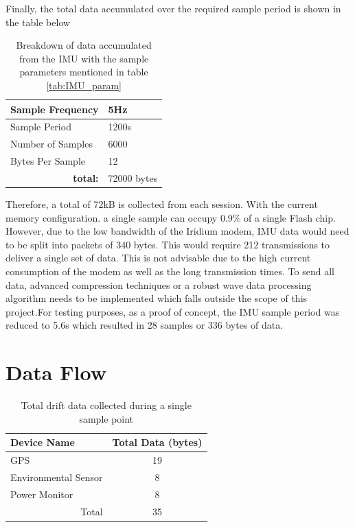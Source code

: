 Finally, the total data accumulated over the required sample period is shown in the table below

\begin{table}[H]
	\centering
	\caption{Breakdown of data accumulated from the IMU with the sample parameters mentioned in table \ref{tab:IMU_param}}
	\begin{tabular}{|l|l|}
		\hline
		Sample Frequency     &  5Hz\\
		\hline
		Sample Period        & 1200s\\
		\hline
		Number of Samples    & 6000 \\ 
		\hline
		Bytes Per Sample     & 12 \\
		\hline
		\multicolumn{1}{r}{\textbf{total:}} & \multicolumn{1}{l}{72000 bytes}\\
	\end{tabular}
	
	\label{tab:IMU_data_total}
\end{table}

Therefore, a total of 72kB is collected from each session. With the current memory configuration. a single sample can occupy 0.9\% of a single Flash chip. However, due to the low bandwidth of the Iridium modem, IMU data would need to be split into packets of 340 bytes. This would require 212 transmissions to deliver a single set of data. This is not advisable due to the high current consumption of the modem as well as the long transmission times. To send all data, advanced compression techniques or a robust wave data processing algorithm needs to be implemented which falls outside the scope of this project.For testing purposes, as a proof of concept, the IMU sample period was reduced to 5.6s which resulted in 28 samples or 336 bytes of data.  

\section{Data Flow}
\begin{table}[H]
	\caption{Total drift data collected during a single sample point}
	\centering
	\begin{tabular}{|l|c|}
		\hline
		\textbf{Device Name}   &  \textbf{Total Data (bytes)}\\
		\hline
		GPS  & 19 \\
		Environmental Sensor & 8 \\
		Power Monitor & 8\\
		\hline
		\multicolumn{1}{r}{Total} & \multicolumn{1}{c}{35}\\
		\cline{2-2}
		\cline{2-2}
	\end{tabular}
	
	\label{tab:total_data}
\end{table}

